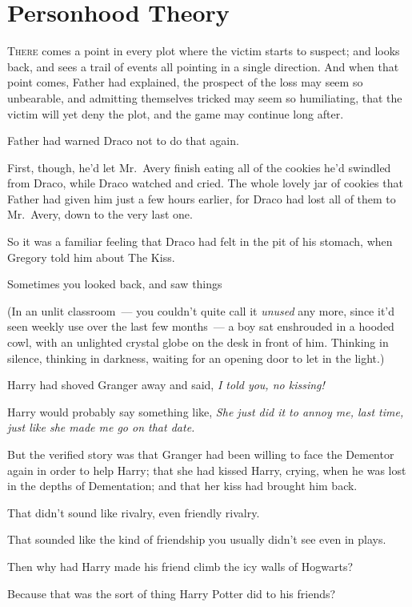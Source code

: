 \chapter{Personhood Theory}

\lettrine{T}{here} comes a
point in every plot where the victim starts to suspect; and looks back, and
sees a trail of events all pointing in a single direction. And when that point
comes, Father had explained, the prospect of the loss may seem so unbearable,
and admitting themselves tricked may seem so humiliating, that the victim will
yet deny the plot, and the game may continue long after.

Father had warned Draco not to do that again.

First, though, he'd let Mr.~Avery finish eating all of the cookies he'd
swindled from Draco, while Draco watched and cried. The whole lovely jar of
cookies that Father had given him just a few hours earlier, for Draco had lost
all of them to Mr.~Avery, down to the very last one.

So it was a familiar feeling that Draco had felt in the pit of his stomach,
when Gregory told him about The Kiss.

Sometimes you looked back, and saw things{\el}

(In an unlit classroom~--- you couldn't quite call it \emph{unused} any more,
since it'd seen weekly use over the last few months~--- a boy sat enshrouded in a
hooded cowl, with an unlighted crystal globe on the desk in front of him.
Thinking in silence, thinking in darkness, waiting for an opening door to let
in the light.)

Harry had shoved Granger away and said, \emph{I told you, no kissing!}

Harry would probably say something like, \emph{She just did it to annoy me,
last time, just like she made me go on that date.}

But the verified story was that Granger had been willing to face the Dementor
again in order to help Harry; that she had kissed Harry, crying, when he was
lost in the depths of Dementation; and that her kiss had brought him back.

That didn't sound like rivalry, even friendly rivalry.

That sounded like the kind of friendship you usually didn't see even in plays.

Then why had Harry made his friend climb the icy walls of Hogwarts?

Because that was the sort of thing Harry Potter did to his friends?

